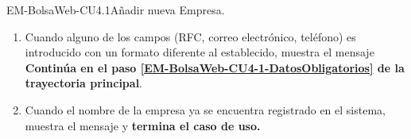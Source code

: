 \begin{UseCase}{EM-BolsaWeb-CU4.1}{Añadir nueva Empresa.}
{\begin{enumerate}
			\item \label{EM-BolsaWeb-CU4-1-E2} Cuando alguno de los campos (RFC, correo electrónico, teléfono) es introducido con un formato diferente al establecido, muestra el mensaje  \textbf{Continúa en el paso \ref{EM-BolsaWeb-CU4-1-DatosObligatorios} de la trayectoria principal}.

			\item \label{EM-BolsaWeb-CU4-1-E3} Cuando el nombre de la empresa ya se encuentra registrado en el sistema, muestra el mensaje  y \textbf{termina el caso de uso.}
		\end{enumerate}	
	}
\end{UseCase}

